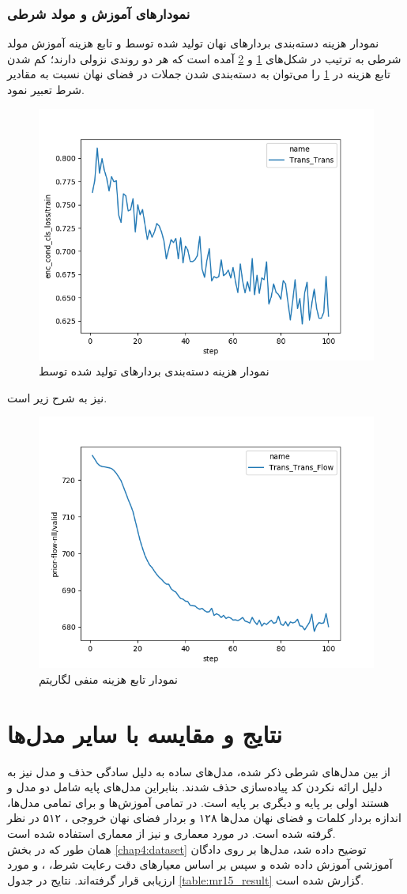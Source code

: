 \subsubsection{نمودار‌های آموزش \wae{} و مولد شرطی}
نمودار هزینه دسته‌بندی بردار‌های نهان تولید شده توسط \encoder{} و تابع هزینه آموزش مولد شرطی به ترتیب در شکل‌های \ref{fig:chap4:enc_cls} و \ref{fig:chap4:prior_flow_nll} آمده است که هر دو روندی نزولی دارند؛ کم شدن تابع هزینه در \ref{fig:chap4:enc_cls} را می‌توان به دسته‌بندی شدن جملات در فضای نهان نسبت به مقادیر شرط تعبیر نمود.
\begin{figure}[h]
    \centering
    \includegraphics[width=.5\textwidth]{images/figs/2019_12_31__11_03_46__enc_cond_cls_loss.png}
    \caption{نمودار هزینه دسته‌بندی بردار‌های تولید شده توسط \encoder{} }
    \label{fig:chap4:enc_cls}
\end{figure}
نیز به شرح زیر است.
\begin{figure}[h]
    \centering
    \includegraphics[width=.5\textwidth]{images/figs/2019_12_31__11_01_10__prior-flow-nll.png}
    \caption{نمودار تابع هزینه  منفی لگاریتم \likelihood{} }
    \label{fig:chap4:prior_flow_nll}
\end{figure}

\section{نتایج و مقایسه با سایر مدل‌ها}
از بین مدل‌های شرطی ذکر شده، مدل‌های ساده به دلیل سادگی حذف و مدل  نیز به دلیل ارائه نکردن کد پیاده‌سازی حذف شدند. بنابراین مدل‌های پایه شامل دو مدل \towardctg{} و \sentigan{} هستند اولی بر پایه \vae{} و دیگری بر پایه \gan{} است. در تمامی آموزش‌ها و برای تمامی مدل‌ها، اندازه بردار \embedding{} کلمات و فضای نهان مدل‌ها ۱۲۸ و بردار فضای نهان خروجی \encoder{}، ۵۱۲ در نظر گرفته شده است. در مورد معماری \encoder{} و \decoder{} نیز از معماری \transformer{} استفاده شده است.
\\
همان طور که در بخش \ref{chap4:dataset} توضیح داده شد، مدل‌ها بر روی دادگان آموزشی  آموزش داده شده و سپس بر اساس معیارهای  دقت رعایت شرط، \bleu{} ، \selfbleu{} و \jaccard{} مورد ارزیابی قرار گرفته‌اند. نتایج در جدول \ref{table:mr15_result} گزارش شده است.

